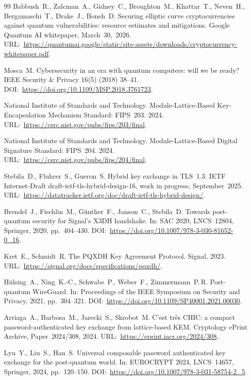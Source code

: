 \documentclass[preprint,12pt]{elsarticle}
\theoremstyle{remark}
\begin{document}
\begin{thebibliography}{99}
Babbush~R., Zalcman~A., Gidney~C., Broughton~M., Khattar~T.,
Neven~H., Bergamaschi~T., Drake~J., Boneh~D.
Securing elliptic curve cryptocurrencies against quantum vulnerabilities:
resource estimates and mitigations.
Google Quantum AI whitepaper, March~30,~2026.
URL:~\url{https://quantumai.google/static/site-assets/downloads/cryptocurrency-whitepaper.pdf}.

Mosca~M.
Cybersecurity in an era with quantum computers: will we be ready?
IEEE Security \& Privacy 16(5) (2018) 38--41.
DOI:~\url{https://doi.org/10.1109/MSP.2018.3761723}.

National Institute of Standards and Technology.
Module-Lattice-Based Key-Encapsulation Mechanism Standard: FIPS~203.
2024.
URL:~\url{https://csrc.nist.gov/pubs/fips/203/final}.

National Institute of Standards and Technology.
Module-Lattice-Based Digital Signature Standard: FIPS~204.
2024.
URL:~\url{https://csrc.nist.gov/pubs/fips/204/final}.

Stebila~D., Fluhrer~S., Gueron~S.
Hybrid key exchange in TLS~1.3.
IETF Internet-Draft draft-ietf-tls-hybrid-design-16, work in progress, September~2025.
URL:~\url{https://datatracker.ietf.org/doc/draft-ietf-tls-hybrid-design/}.

Brendel~J., Fischlin~M., G\"{u}nther~F., Janson~C., Stebila~D.
Towards post-quantum security for Signal's X3DH handshake.
In: SAC 2020, LNCS~12804, Springer, 2020, pp.~404--430.
DOI:~\url{https://doi.org/10.1007/978-3-030-81652-0_16}.

Kret~E., Schmidt~R.
The PQXDH Key Agreement Protocol.
Signal, 2023.
URL:~\url{https://signal.org/docs/specifications/pqxdh/}.

H\"{u}lsing~A., Ning~K.-C., Schwabe~P., Weber~F., Zimmermann~P.\,R.
Post-quantum WireGuard.
In: Proceedings of the IEEE Symposium on Security and Privacy, 2021, pp.~304--321.
DOI:~\url{https://doi.org/10.1109/SP40001.2021.00030}.

Arriaga~A., Barbosa~M., Jarecki~S., Skrobot~M.
C'est tr\`es CHIC: a compact password-authenticated key exchange from lattice-based KEM.
Cryptology ePrint Archive, Paper~2024/308, 2024.
URL:~\url{https://eprint.iacr.org/2024/308}.

Lyu~Y., Liu~S., Han~S.
Universal composable password authenticated key exchange for the post-quantum world.
In: EUROCRYPT 2024, LNCS~14657, Springer, 2024, pp.~120--150.
DOI:~\url{https://doi.org/10.1007/978-3-031-58754-2_5}.


\end{thebibliography}
\end{document}
